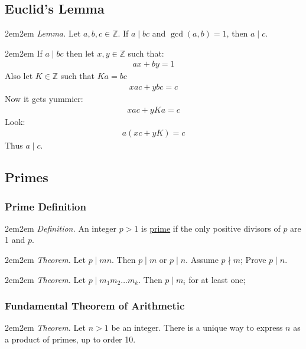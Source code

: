 \documentclass[10pt,oneside]{book}
\newcommand{\Z}{\mathbb{Z}}\newcommand{\R}{\mathbb{R}}\newcommand{\N}{\mathbb{N}}
\newcommand{\gspc}{\vspace{0.13cm}} %
\newcommand{\ul}[1]{\underline{#1}}
\let\endoldproof\endproof
\renewenvironment{proof}[1][\proofname]
  {\vspace{0.2cm}\begin{adjustwidth}{2em}{2em}
   \oldproof[#1]}
  {\endoldproof
   \end{adjustwidth}}
\begin{document}
\subsection*{Euclid's Lemma}
\begin{adjustwidth}{2em}{2em}
  \textit{Lemma. } Let $a,b,c\in\Z$. If $a\mid bc$ and $\gcd(a,b) = 1$, then $a\mid c$. 
  \begin{proof}
    If $a\mid bc$ then let $x, y \in \Z$ such that:
    \begin{align*}
      ax + by = 1
    \end{align*}
    Also let $K\in \Z$ such that $Ka = bc$
    \begin{align*}
      xac + ybc = c
    \end{align*}
    Now it gets yummier:
    \begin{align*}
      xac + yKa = c
    \end{align*}
    Look:
    \begin{align*}
      a(xc + yK) = c
    \end{align*}
    Thus $a\mid c$.
  \end{proof}
\end{adjustwidth}


\subsection*{Primes}
\subsubsection*{Prime Definition}
\begin{adjustwidth}{2em}{2em}\gspc
  \textit{Definition. }An integer $p>1$ is \ul{prime} if the only positive divisors of $p$ are 1 and $p$. 
\end{adjustwidth}\gspc
\begin{adjustwidth}{2em}{2em}\gspc
  \textit{Theorem. }Let $p\mid mn$. Then $p\mid m$ or $p\mid n$. Assume $p\nmid m$; Prove $p\mid n$.  
\end{adjustwidth}\gspc
\begin{adjustwidth}{2em}{2em}\gspc
  \textit{Theorem. }Let $p\mid m_1m_2\ldots m_k$. Then $p\mid m_i$ for at least one;
\end{adjustwidth}
\subsubsection*{Fundamental Theorem of Arithmetic}
\begin{adjustwidth}{2em}{2em}
  \textit{Theorem. }Let $n>1$ be an integer. There is a unique way to express $n$ as a product of primes, up to order 10.
\end{adjustwidth}\gspc
\end{document}
